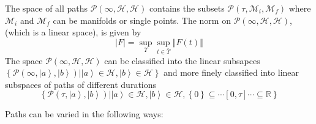\documentclass[aps,preprint]{revtex4}
\begin{document}
The space of all paths $\mathcal{P}\left( \infty ,\mathcal{H},\mathcal{H}%
\right) $ contains the subsets $\mathcal{P}\left( \tau ,\mathcal{M}_{i},%
\mathcal{M}_{f}\right) $ where $\mathcal{M}_{i}$ and $\mathcal{M}_{f}$ can
be manifolds or single points. The norm on $\mathcal{P}\left( \infty ,%
\mathcal{H},\mathcal{H}\right) $, (which is a linear space), is given by 
\begin{equation}
\left\vert F\right\vert =\sup_{\Upsilon }\sup_{t\in \bar{\Upsilon}%
}\left\Vert F\left( t\right) \right\Vert 
\end{equation}%
The space $\mathcal{P}\left( \infty ,\mathcal{H},\mathcal{H}\right) $ can be
classified into the linear subsapces $\left\{ \mathcal{P}\left( \infty
,\left\vert a\right\rangle ,\left\vert b\right\rangle \right) |\left\vert
a\right\rangle \in \mathcal{H},\left\vert b\right\rangle \in \mathcal{H}%
\right\} $ and more finely classified into linear subspaces of paths of
different durations 
\begin{equation}
\left\{ \mathcal{P}\left( \tau ,\left\vert a\right\rangle ,\left\vert
b\right\rangle \right) |\left\vert a\right\rangle \in \mathcal{H},\left\vert
b\right\rangle \in \mathcal{H},\left\{ 0\right\} \subseteq \cdots \left[
0,\tau \right] \cdots \subseteq \mathbb{R}\right\} 
\end{equation}

Paths can be varied in the following ways:
\end{document}
